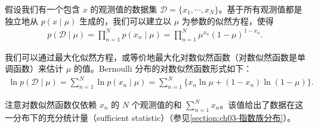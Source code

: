 \documentclass[../../main.tex]{subfiles}
\begin{document}
假设我们有一个包含 $x$ 的观测值的数据集 $\mathcal{D}=\{x_1,\cdots,x_N\}$。基于所有观测值都是独立地从 $p(x\mid\mu)$ 生成的，我们可以建立以 $\mu$ 为参数的似然方程，使得
\begin{align}
p(\mathcal{D}\mid\mu)=\prod_{n=1}^{N}p(x_n\mid\mu)=\prod_{n=1}^{N}\mu^{x_n}(1-\mu)^{1-x_n}.
\label{align:ch03-Bernoulli似然}
\end{align}

我们可以通过最大化似然方程，或等价地最大化对数似然函数（对数似然函数是单调函数）来估计 $\mu$ 的值。Bernoulli 分布的对数似然函数形式如下：
\begin{align}
\ln p(\mathcal{D}\mid\mu)=\sum_{n=1}^{N}\ln p(x_n\mid\mu)=\sum_{n=1}^{N}\bigl\{x_n\ln\mu+(1-x_n)\ln(1-\mu)\bigr\}.
\label{align:ch03-Bernoulli对数似然}
\end{align}

注意对数似然函数仅依赖 $x_n$ 的 $N$ 个观测值的和 $\sum_{n=1}^{N}x_n$。该值给出了数据在这一分布下的充分统计量（sufficient statistic）（参见\cref{section:ch03-指数族分布}）。
\end{document}
